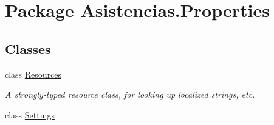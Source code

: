 \hypertarget{namespace_asistencias_1_1_properties}{\section{Package Asistencias.\-Properties}
\label{namespace_asistencias_1_1_properties}
}
\subsection*{Classes}
\begin{DoxyCompactItemize}
\item 
class \hyperlink{class_asistencias_1_1_properties_1_1_resources}{Resources}
\begin{DoxyCompactList}\small\item\em A strongly-\/typed resource class, for looking up localized strings, etc. \end{DoxyCompactList}\item 
class \hyperlink{class_asistencias_1_1_properties_1_1_settings}{Settings}
\end{DoxyCompactItemize}
